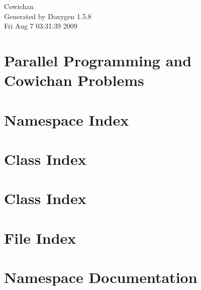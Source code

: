 \documentclass[a4paper]{book}
\begin{document}
\begin{titlepage}
\vspace*{7cm}
\begin{center}
{\Large Cowichan }\\
\vspace*{1cm}
{\large Generated by Doxygen 1.5.8}\\
\vspace*{0.5cm}
{\small Fri Aug 7 03:31:39 2009}\\
\end{center}
\end{titlepage}
\clearemptydoublepage
{}
\tableofcontents
\clearemptydoublepage
{}
\chapter{Parallel Programming and Cowichan Problems}
\label{index}\hypertarget{index}{}
\chapter{Namespace Index}

\chapter{Class Index}

\chapter{Class Index}

\chapter{File Index}

\chapter{Namespace Documentation}




\end{document}
